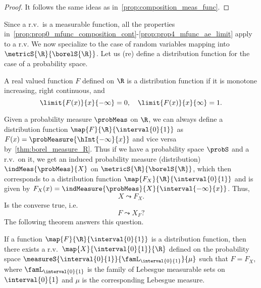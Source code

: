 \begin{proof}
    It follows the same ideas as in~\ref{prop:composition_meas_func}.
\end{proof}
Since a r.v.~is a measurable function, all the
properties in~\ref{prop:prop0_mfunc_composition_cont}-\ref{prop:prop4_mfunc_ae_limit} apply to a r.v.
We now specialize to the case of random variables mapping into $\metricS{\R}{\borelS{\R}}$. Let us (re) define
a distribution function for the case of a probability space.
\begin{Definition}[name=Distribution function]
    A real valued function $F$ defined on $\R$ is a distribution function if it is monotone increasing, right
    continuous, and 
    \[\limit{F(x)}{x}{-\infty} = 0,\quad \limit{F(x)}{x}{\infty} = 1.\]
\end{Definition}
Given a probability measure $\probMeas$ on $\R$, we can always define a distribution function
$\map{F}{\R}{\interval{0}{1}}$ as $F(x) = \probMeasure{\hInt{-\infty}{x}}$ and vice versa
by~\ref{thm:borel_measure_R}. Thus if we have a probability space $\probS$ and a r.v.~on it, we get an induced
probability measure (distribution) $\indMeas{\probMeas}{X}$ on $\metricS{\R}{\borelS{\R}}$,
which then corresponds to a distribution function $\map{F_X}{\R}{\interval{0}{1}}$ and is 
given by $F_X(x) = \indMeasure{\probMeas}{X}{\interval{-\infty}{x}}$.
Thus,
\[X \leadsto F_X.\]
Is the converse true, i.e.
\[F \leadsto X_F?\]
The following theorem answers this question.
\begin{Theorem}\label{thm:distribution_func_to_rv}
    If a function $\map{F}{\R}{\interval{0}{1}}$ is a distribution function, then there exists a
    r.v.~$\map{X}{\interval{0}{1}}{\R}$ defined
    on the probability space $\measureS{\interval{0}{1}}{\famL_{\interval{0}{1}}}{\mu}$ such that $F = F_X$,
    where $\famL_{\interval{0}{1}}$ is the family of Lebesgue measurable sets on $\interval{0}{1}$ and $\mu$
    is the corresponding Lebesgue measure.
\end{Theorem}
